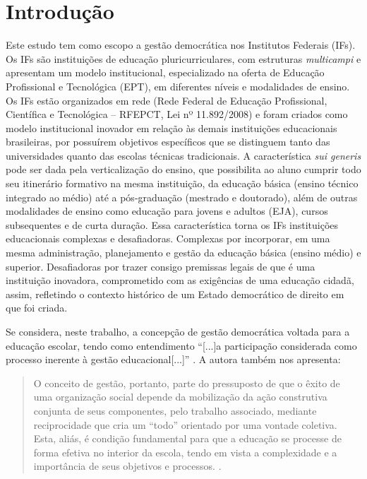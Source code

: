 \documentclass[portuguese]{textolivre}
\begin{document}
\section{Introdução}\label{sec-intro}
Este estudo tem como escopo a gestão democrática nos Institutos Federais (IFs). Os IFs são instituições de educação pluricurriculares, com estruturas \textit{multicampi} e apresentam um modelo institucional, especializado na oferta de Educação Profissional e Tecnológica (EPT), em diferentes níveis e modalidades de ensino. Os IFs estão organizados em rede (Rede Federal de Educação Profissional, Científica e Tecnológica – RFEPCT, Lei nº 11.892/2008) \cite{silva_institutos_2009} e foram criados como modelo institucional inovador em relação às demais instituições educacionais brasileiras, por possuírem objetivos específicos que se distinguem tanto das universidades quanto das escolas técnicas tradicionais. A característica \textit{sui generis} pode ser dada pela verticalização do ensino, que possibilita ao aluno cumprir todo seu itinerário formativo na mesma instituição, da educação básica (ensino técnico integrado ao médio) até a pós-graduação (mestrado e doutorado), além de outras modalidades de ensino como educação para jovens e adultos (EJA), cursos subsequentes e de curta duração. Essa característica torna os IFs  instituições educacionais complexas e desafiadoras. Complexas por incorporar, em uma mesma administração, planejamento e gestão da educação básica (ensino médio) e superior. Desafiadoras por trazer consigo premissas legais de que é uma instituição inovadora, comprometido com as exigências de uma educação cidadã, assim, refletindo o contexto histórico de um Estado democrático de direito em que foi criada.

Se considera, neste trabalho, a concepção de gestão democrática voltada para a educação escolar, tendo como entendimento ``[...]a participação considerada como processo inerente à gestão educacional[...]''  \cite[p.~19]{luck_gestao_2006}. A autora também nos apresenta:

\begin{quote}
    O conceito de gestão, portanto, parte do pressuposto de que o êxito de uma organização social depende da mobilização da ação construtiva conjunta de seus componentes, pelo trabalho associado, mediante reciprocidade que cria um “todo” orientado por uma vontade coletiva. Esta, aliás, é condição fundamental para que a educação se processe de forma efetiva no interior da escola, tendo em vista a complexidade e a importância de seus objetivos e processos. \cite[p.~21]{luck_gestao_2006}.
\end{quote}
\end{document}
